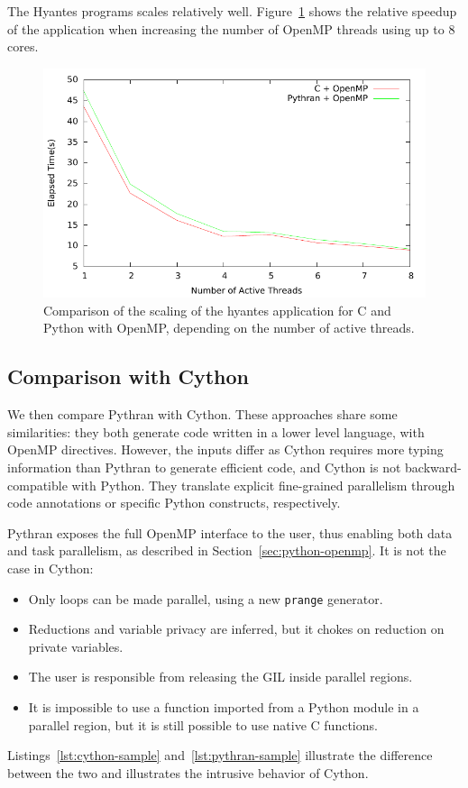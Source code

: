 \documentclass[conference]{IEEEtran}
\begin{document}
The Hyantes programs scales relatively well. Figure~\ref{fig:hyantes-speedup}
shows the relative speedup of the application when increasing the number of
OpenMP threads using up to 8 cores.

\begin{figure}

    \caption{Comparison of the scaling of the hyantes application for C and
    Python with OpenMP, depending on the number of active threads.}
    \label{fig:hyantes-speedup}

    \includegraphics[width=.5\textwidth]{hyantes_omp_bench.pdf}

\end{figure}


\subsection{Comparison with Cython}

We then compare Pythran with Cython. These approaches share some similarities:
they both generate code written in a lower level language, with OpenMP
directives. However, the inputs differ as Cython requires more typing
information than Pythran to generate efficient code, and Cython is not
backward-compatible with Python. They translate explicit fine-grained
parallelism through code annotations or specific Python constructs,
respectively.

Pythran exposes the full OpenMP interface to the user, thus enabling both data
and task parallelism, as described in Section~\ref{sec:python-openmp}. It is
not the case in Cython:
%
\begin{itemize}

    \item Only loops can be made parallel, using a new \texttt{prange} generator.

    \item Reductions and variable privacy are inferred, but it chokes on
        reduction on private variables.

    \item The user is responsible from releasing the GIL inside parallel
        regions.

    \item It is impossible to use a function imported from a Python module in a
        parallel region, but it is still possible to use native C functions.

\end{itemize}
%
Listings~\ref{lst:cython-sample} and~\ref{lst:pythran-sample} illustrate the
difference between the two and illustrates the intrusive behavior of Cython.
\end{document}
